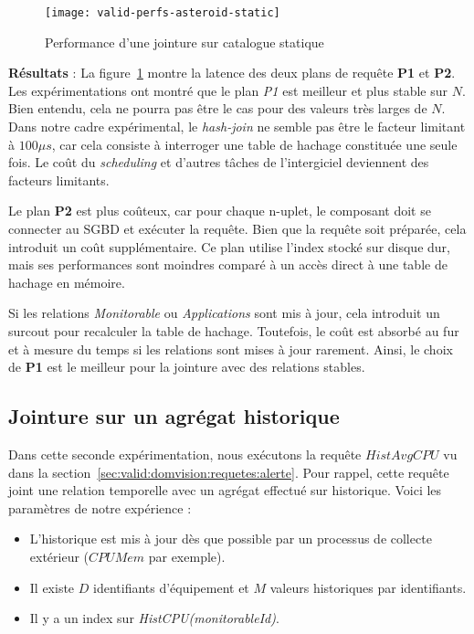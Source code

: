 \begin{figure}[ht]
	\centering
	\texttt{[image: valid-perfs-asteroid-static]}
	\caption{Performance d'une jointure sur catalogue statique}\label{fig:valid:perfs:asteroid:static}
\end{figure}

\textbf{Résultats} : La figure~\ref{fig:valid:perfs:asteroid:static} montre la latence des deux plans de requête \textbf{P1} et \textbf{P2}. Les expérimentations ont montré que le plan \textit{P1} est meilleur et plus stable sur $N$. Bien entendu, cela ne pourra pas être le cas pour des valeurs très larges de $N$. Dans notre cadre expérimental, le \textit{hash-join} ne semble pas être le facteur limitant à $100\mu s$, car cela consiste à interroger une table de hachage constituée une seule fois. Le coût du \textit{scheduling} et d'autres tâches de l'intergiciel deviennent des facteurs limitants. 

Le plan \textbf{P2} est plus coûteux, car pour chaque n-uplet, le composant doit se connecter au SGBD et exécuter la requête. Bien que la requête soit préparée, cela introduit un coût supplémentaire. Ce plan utilise l'index stocké sur disque dur, mais ses performances sont moindres comparé à un accès direct à une table de hachage en mémoire.

Si les relations \textit{Monitorable} ou \textit{Applications} sont mis à jour, cela introduit un surcout pour recalculer la table de hachage. Toutefois, le coût est absorbé au fur et à mesure du temps si les relations sont mises à jour rarement. Ainsi, le choix de \textbf{P1} est le meilleur pour la jointure avec des relations stables.

\subsection{Jointure sur un agrégat historique}
Dans cette seconde expérimentation, nous exécutons la requête $HistAvgCPU$ vu dans la section~\ref{sec:valid:domvision:requetes:alerte}. Pour rappel, cette requête joint une relation temporelle avec un agrégat effectué sur historique. Voici les paramètres de notre expérience :
\begin{itemize}
	\item L'historique est mis à jour dès que possible par un processus de collecte extérieur ($CPUMem$ par exemple).
	\item Il existe $D$ identifiants d'équipement et $M$ valeurs historiques par identifiants.
	\item Il y a un index sur \textit{HistCPU(monitorableId)}.
\end{itemize}


